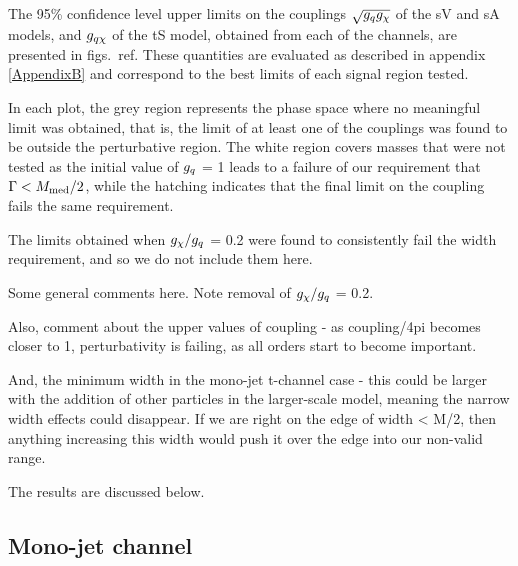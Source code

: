 The 95\% confidence level upper limits on the couplings $\sqrt{g_q g_{\chi}}$ of the sV and sA models, and $g_{q \chi}$ of the tS model, obtained from each of the \monoX channels, are presented in figs.~ref{}. These quantities are evaluated as described in appendix \ref{AppendixB} and correspond to the best limits of each signal region tested.

In each plot, the grey region represents the phase space where no meaningful limit was obtained, that is, the limit of at least one of the couplings was found to be outside the perturbative region. The white region covers masses that were not tested as the initial value of $g_q$ = 1 leads to a failure of our requirement that $\Gamma < M_{\mathrm{med}} / 2$, while the hatching indicates that the final limit on the coupling fails the same requirement.

The limits obtained when $g_{\chi} / g_q$ = 0.2 were found to consistently fail the width requirement, and so we do not include them here.

Some general comments here. Note removal of $g_{\chi} / g_q$ = 0.2.

Also, comment about the upper values of coupling - as coupling/4pi becomes closer to 1, perturbativity is failing, as all orders start to become important.

And, the minimum width in the mono-jet t-channel case - this could be larger with the addition of other particles in the larger-scale model, meaning the narrow width effects could disappear. If we are right on the edge of width < M/2, then anything increasing this width would push it over the edge into our non-valid range.

The results are discussed below.

\subsection{Mono-jet channel}

